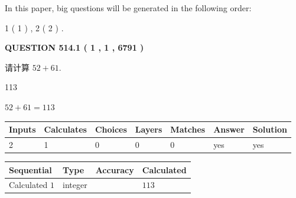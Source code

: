 \documentclass{ctexart}
\begin{document}
   
   
\vspace{0.2in}
   
In this paper, big questions will be generated in the following order: 
   
   
   1 ( 1 )
 ,
   2 ( 2 )
 .
  
\vspace{0.2in}
  
{\textbf{\Large{QUESTION
514.1 
 ( 1 , 1 , 6791 )
}}}
  
  
 
请计算 $ %
52 +  %
61 $.
 
 
 
\noindent{}
 
 

113
 
 
\noindent{}
 
 

 
 
 
\noindent{}
 
 

$ %
52 +  %
61=   %
113$
 
 
\noindent{}
 
 

 
   
   
   
   
\noindent\begin{tabular}{|l|l|l|l|l|l|l|}
 \hline
Inputs & Calculates & Choices & Layers & Matches & Answer & Solution \\ \hline
 2  & 
 1  & 
 0
  & 
 0  & 
 0  & 
  yes & 
  yes 
  \\ \hline
 \end{tabular}
   
   
   
   
\noindent{}
   
   
  
  
\noindent\begin{tabular}{|l|l|l|l|}
\hline
 Sequential & Type & Accuracy & Calculated \\ 
\hline
 
 
  Calculated $  1 $ & integer &  & 
  $ 113 $ 
 \\  \hline  
 \end{tabular}
   
\end{document}
